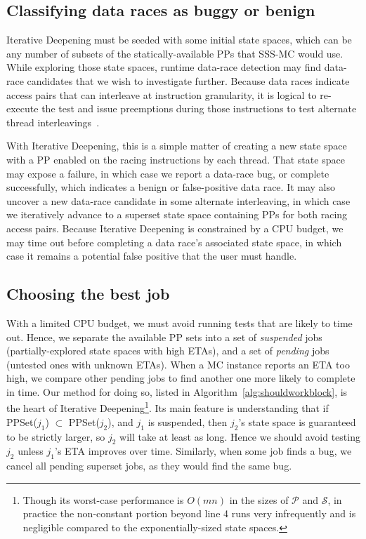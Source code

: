 \subsection{Classifying data races as buggy or benign} %

Iterative Deepening must be seeded with some initial state spaces,
which can be any number of subsets of the statically-available PPs that SSS-MC would use.
While exploring those state spaces, runtime data-race detection may find data-race candidates that we wish to investigate further.
Because data races indicate access pairs that can interleave at instruction granularity,
it is logical to re-execute the test and issue preemptions during those instructions to test alternate thread interleavings~\cite{racefuzzer,portend}.

With Iterative Deepening, this is a simple matter of creating a new state space with a PP enabled on the racing instructions by each thread.
That state space may expose a failure, in which case we report a data-race bug,
or complete successfully, which indicates a benign or false-positive data race.
It may also uncover a new data-race candidate in some alternate interleaving,
in which case we iteratively advance to a superset state space containing PPs for both racing access pairs.
Because Iterative Deepening is constrained by a CPU budget,
we may time out before completing a data race's associated state space,
in which case it remains a potential false positive that the user must handle.

\subsection{Choosing the best job}

\newcommand\PendingJobs{\ensuremath{\mathcal{P}}}
\newcommand\SuspendedJobs{\ensuremath{\mathcal{S}}}
\newcommand\GetETA[1]{ETA(#1)}
\newcommand\GetPPSet[1]{PPSet(#1)}
With a limited CPU budget, we must avoid running tests that are likely to time out.
Hence, we separate the available PP sets into a set of {\em suspended} jobs (partially-explored state spaces with high ETAs),
and a set of {\em pending} jobs (untested ones with unknown ETAs).
When a MC instance reports an ETA too high,
we compare other pending jobs to find another one more likely to complete in time.
%
Our method for doing so, listed in Algorithm~\ref{alg:shouldworkblock}, is the heart of Iterative Deepening\footnote{
Though its worst-case performance is $O(mn)$ in the
sizes of $\mathcal{P}$ and $\mathcal{S}$,
in practice the non-constant portion beyond line 4 runs very infrequently
and is negligible compared to the exponentially-sized state spaces.}.
Its main feature is understanding that if \GetPPSet{$j_1$} $\subset$ \GetPPSet{$j_2$},
and $j_1$ is suspended,
then $j_2$'s state space is guaranteed to be strictly larger, so $j_2$ will take at least as long.
Hence we should avoid testing $j_2$ unless $j_1$'s ETA improves over time.
Similarly, when some job finds a bug, we cancel all pending superset jobs, as they would find the same bug.

